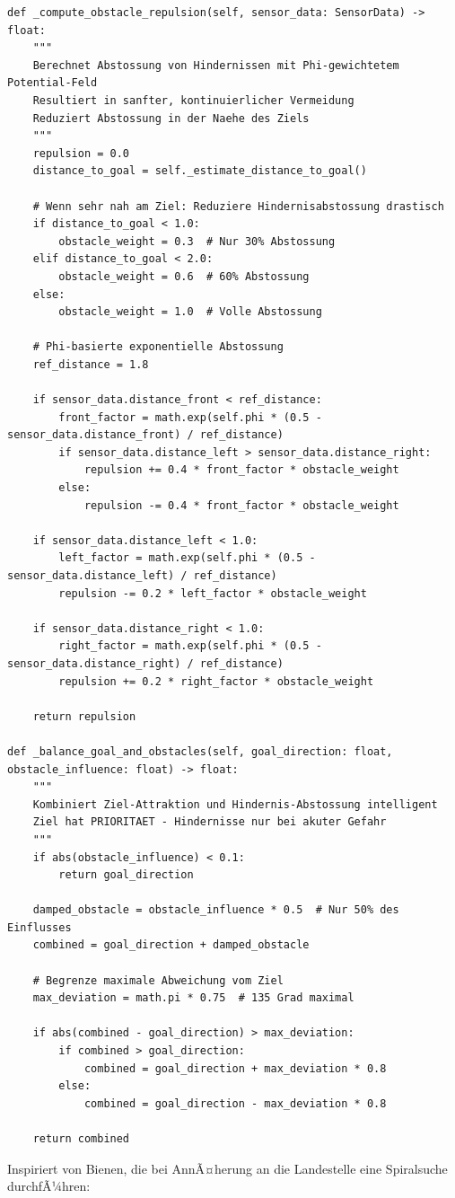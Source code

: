 ﻿\documentclass[a4paper,12pt]{article}
\theoremstyle{definition}
\begin{document}
\begin{lstlisting}[style=pythonstyle, caption={Hindernis-Behandlung mit Phi-Gewichtung}]
def _compute_obstacle_repulsion(self, sensor_data: SensorData) -> float:
    """
    Berechnet Abstossung von Hindernissen mit Phi-gewichtetem Potential-Feld
    Resultiert in sanfter, kontinuierlicher Vermeidung
    Reduziert Abstossung in der Naehe des Ziels
    """
    repulsion = 0.0
    distance_to_goal = self._estimate_distance_to_goal()
    
    # Wenn sehr nah am Ziel: Reduziere Hindernisabstossung drastisch
    if distance_to_goal < 1.0:
        obstacle_weight = 0.3  # Nur 30% Abstossung
    elif distance_to_goal < 2.0:
        obstacle_weight = 0.6  # 60% Abstossung
    else:
        obstacle_weight = 1.0  # Volle Abstossung
    
    # Phi-basierte exponentielle Abstossung
    ref_distance = 1.8
    
    if sensor_data.distance_front < ref_distance:
        front_factor = math.exp(self.phi * (0.5 - sensor_data.distance_front) / ref_distance)
        if sensor_data.distance_left > sensor_data.distance_right:
            repulsion += 0.4 * front_factor * obstacle_weight
        else:
            repulsion -= 0.4 * front_factor * obstacle_weight
    
    if sensor_data.distance_left < 1.0:
        left_factor = math.exp(self.phi * (0.5 - sensor_data.distance_left) / ref_distance)
        repulsion -= 0.2 * left_factor * obstacle_weight
    
    if sensor_data.distance_right < 1.0:
        right_factor = math.exp(self.phi * (0.5 - sensor_data.distance_right) / ref_distance)
        repulsion += 0.2 * right_factor * obstacle_weight
    
    return repulsion

def _balance_goal_and_obstacles(self, goal_direction: float, obstacle_influence: float) -> float:
    """
    Kombiniert Ziel-Attraktion und Hindernis-Abstossung intelligent
    Ziel hat PRIORITAET - Hindernisse nur bei akuter Gefahr
    """
    if abs(obstacle_influence) < 0.1:
        return goal_direction
    
    damped_obstacle = obstacle_influence * 0.5  # Nur 50% des Einflusses
    combined = goal_direction + damped_obstacle
    
    # Begrenze maximale Abweichung vom Ziel
    max_deviation = math.pi * 0.75  # 135 Grad maximal
    
    if abs(combined - goal_direction) > max_deviation:
        if combined > goal_direction:
            combined = goal_direction + max_deviation * 0.8
        else:
            combined = goal_direction - max_deviation * 0.8
    
    return combined
\end{lstlisting}
Inspiriert von Bienen, die bei AnnÃ¤herung an die Landestelle eine Spiralsuche durchfÃ¼hren:
\end{document}
